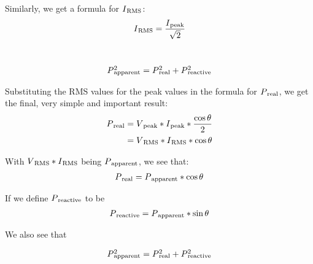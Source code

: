 \documentclass[a4paper]{article}
\def\SB#1{\textsubscript{{#1}}}
\def\SPSB#1#2{\rlap{\textsuperscript{#1}}\SB{#2}}
\begin{document}
Similarly, we get a formula for $I\SB{RMS}$:\\

\begin{align*}
  I\SB{RMS} &= \frac{I\SB{peak}}{\sqrt{2}}\\
\end{align*}\

\begin{align*}
  P\SPSB{2}{apparent} &= P\SPSB{2}{real} + P\SPSB{2}{reactive}\\
\end{align*}

Substituting the RMS values for the peak values in the formula for 
$P\SB{real}$, we get the final, very simple and important result:\\

\begin{align*}
  P\SB{real} &= V\SB{peak} * I\SB{peak} * \frac{\cos{\theta}}{2}\\
  &= V\SB{RMS} * I\SB{RMS} * \cos{\theta} \\
\end{align*}

With $V\SB{RMS} * I\SB{RMS}$ being $P\SB{apparent}$, we  see that:\\

\begin{align*}
  P\SB{real} &= P\SB{apparent} * \cos{\theta} \\
\end{align*}

If we define $P\SB{reactive}$ to be\\

\begin{align*}
  P\SB{reactive} &= P\SB{apparent} * \sin{\theta} \\
\end{align*}

We also see that\

\begin{align*}
  P\SPSB{2}{apparent} &= P\SPSB{2}{real} + P\SPSB{2}{reactive} \\
\end{align*}
\end{document}
